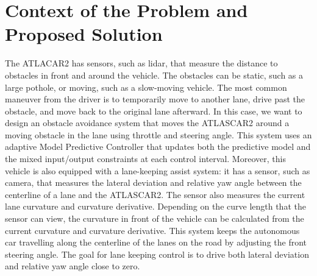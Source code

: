 \documentclass[conference, 11pt]{IEEEtran}
\begin{document}
\section{Context of the Problem and \\  Proposed Solution}
The ATLACAR2 has sensors, such as lidar, that measure the distance to obstacles in front and around the vehicle. The obstacles can be static, such as a large pothole, or moving, such as a slow-moving vehicle. The most common maneuver from the driver is to temporarily move to another lane, drive past the obstacle, and move back to the original lane afterward.
In this case, we want to design an obstacle avoidance system that moves the ATLASCAR2 around a moving obstacle in the lane using throttle and steering angle. This system uses an adaptive Model Predictive Controller that updates both the predictive model and the mixed input/output constraints at each control interval. Moreover, this vehicle is also equipped with a lane-keeping assist system: it has a sensor, such as camera, that measures the lateral deviation and relative yaw angle between the centerline of a lane and the ATLASCAR2. The sensor also measures the current lane curvature and curvature derivative. Depending on the curve length that the sensor can view, the curvature in front of the vehicle can be calculated from the current curvature and curvature derivative. This system keeps the autonomous car travelling along the centerline of the lanes on the road by adjusting the front steering angle. The goal for lane keeping control is to drive both lateral deviation and relative yaw angle close to zero.
\end{document}
